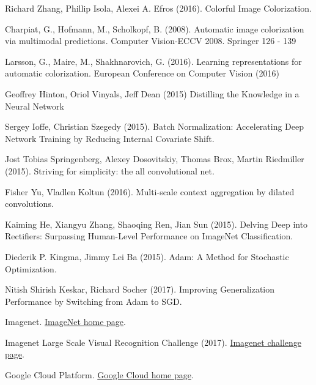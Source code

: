 \documentclass[twoside,twocolumn]{article}
\begin{document}
\begin{thebibliography}{99} %

Richard Zhang, Phillip Isola, Alexei A. Efros (2016).
\newblock Colorful Image Colorization.

Charpiat, G., Hofmann, M., Scholkopf, B. (2008).
\newblock Automatic image colorization via multimodal
predictions.
\newblock Computer Vision-ECCV 2008. Springer 126 - 139

Larsson, G., Maire, M., Shakhnarovich, G. (2016).
\newblock Learning representations for automatic
colorization.
\newblock European Conference on Computer Vision (2016)

Geoffrey Hinton, Oriol Vinyals, Jeff Dean (2015)
\newblock Distilling the Knowledge in a Neural Network

Sergey Ioffe, Christian Szegedy (2015).
\newblock Batch Normalization: Accelerating Deep Network Training by Reducing Internal Covariate Shift.

Jost Tobias Springenberg, Alexey Dosovitskiy, Thomas Brox, Martin Riedmiller (2015).
\newblock Striving for simplicity: the all convolutional net.

Fisher Yu, Vladlen Koltun (2016).
\newblock Multi-scale context aggregation by dilated convolutions.

Kaiming He, Xiangyu Zhang, Shaoqing Ren, Jian Sun (2015).
\newblock Delving Deep into Rectifiers: Surpassing Human-Level Performance on ImageNet Classification.

Diederik P. Kingma, Jimmy Lei Ba (2015).
\newblock Adam: A Method for Stochastic Optimization.

Nitish Shirish Keskar, Richard Socher (2017).
\newblock Improving Generalization Performance by Switching from Adam to SGD.

Imagenet.
\newblock \href{http://www.image-net.org/index}{ImageNet home page}.

Imagenet Large Scale Visual Recognition Challenge (2017).
\newblock \href{http://www.image-net.org/challenges/LSVRC/}{Imagenet challenge page}.

Google Cloud Platform.
\newblock \href{https://cloud.google.com/}{Google Cloud home page}.


\end{thebibliography}
\end{document}
